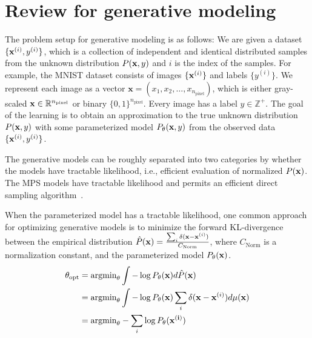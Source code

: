\documentclass[nonatbib]{article}
\newcommand{\citep}{\cite}
\begin{document}
















\appendix

\section{Review for generative modeling \label{appendix: generative_modeling}}


The problem setup for generative modeling is as follows:
We are given a dataset $\{{\bf x}^{(i)}, y^{(i)}\}$, which is a collection of independent and identical distributed samples from the unknown distribution $P({\bf x}, y)$ and $i$ is the index of the samples.
For example, the MNIST dataset consists of images $\{ {\bf x}^{(i)} \}$ and labels $\{ y^{(i)} \}$. 
We represent each image as a vector $\mathbf{x}=(x_1, x_2, \ldots, x_{n_\text{pixel}})$, which is either gray-scaled ${\bf x} \in \mathbb{R}^{n_\text{pixel}}$ or binary $\{0, 1\}^{n_\text{pixel}}$.
Every image has a label $y \in \mathbb{Z}^+$.
The goal of the learning is to obtain an approximation to the true unknown distribution $P({\bf x}, y)$ with some parameterized model $P_\theta({\bf x}, y)$ from the observed data $\{{\bf x}^{(i)}, y^{(i)}\}$.


The generative models can be roughly separated into two categories by whether the models have tractable likelihood, i.e., efficient evaluation of normalized $P({\bf x})$.
The MPS models have tractable likelihood and permits an efficient direct sampling algorithm~\citep{ferris2012perfect}.


When the parameterized model has a tractable likelihood, one common approach for optimizing generative models is to minimize the forward KL-divergence between the empirical distribution $\hat{P}({\bf x}) = \frac{\sum_{i} \delta({\bf x}- {\bf x}^{(i)}) }{C_\text{Norm}}$, where $C_\text{Norm}$ is a normalization constant, and the parameterized model $P_\theta({\bf x})$.
\begin{align}
    \theta_\text{opt} &= \text{argmin}_\theta \int -\log {P_\theta({\bf x})} d\hat{P}({\bf x}) \\
    &= \text{argmin}_\theta  \int -\log {P_\theta({\bf x} )} \sum_{i} \delta({\bf x}- {\bf x}^{(i)}) d\mu(\bf x) \\
&= \text{argmin}_\theta -\sum_{i} \log {P_\theta({\bf x^{(i)}})}
\end{align}
    
\end{document}
